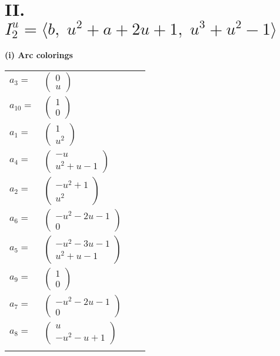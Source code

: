 \documentclass[1p]{elsarticle_modified}
\theoremstyle{definition}
\begin{document}
\centering \section*{II. $I^u_{2}= \langle b,\;u^2+a+2 u+1,\;u^3+u^2-1 \rangle$}
\flushleft \textbf{(i) Arc colorings}\\
\begin{tabular}{m{7pt} m{180pt} m{7pt} m{180pt} }
\flushright $a_{3}=$&$\begin{pmatrix}0\\u\end{pmatrix}$ \\
\flushright $a_{10}=$&$\begin{pmatrix}1\\0\end{pmatrix}$ \\
\flushright $a_{1}=$&$\begin{pmatrix}1\\u^2\end{pmatrix}$ \\
\flushright $a_{4}=$&$\begin{pmatrix}- u\\u^2+u-1\end{pmatrix}$ \\
\flushright $a_{2}=$&$\begin{pmatrix}- u^2+1\\u^2\end{pmatrix}$ \\
\flushright $a_{6}=$&$\begin{pmatrix}- u^2-2 u-1\\0\end{pmatrix}$ \\
\flushright $a_{5}=$&$\begin{pmatrix}- u^2-3 u-1\\u^2+u-1\end{pmatrix}$ \\
\flushright $a_{9}=$&$\begin{pmatrix}1\\0\end{pmatrix}$ \\
\flushright $a_{7}=$&$\begin{pmatrix}- u^2-2 u-1\\0\end{pmatrix}$ \\
\flushright $a_{8}=$&$\begin{pmatrix}u\\- u^2- u+1\end{pmatrix}$\\&\end{tabular}
\end{document}

